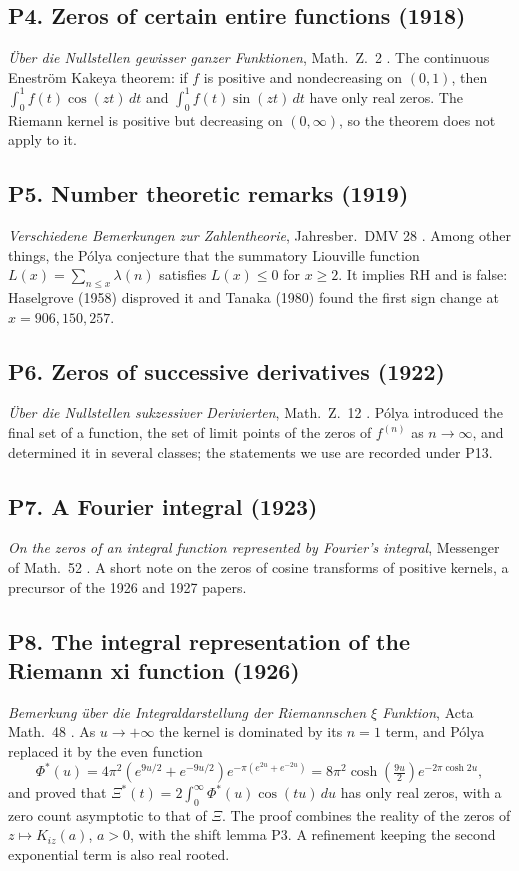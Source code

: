 \subsection*{P4. Zeros of certain entire functions (1918)}
\emph{\"Uber die Nullstellen gewisser ganzer Funktionen}, Math.\ Z.\ 2 \cite{Polya18}. The continuous Enestr\"om Kakeya theorem: if $f$ is positive and nondecreasing on $(0,1)$, then $\int_0^1f(t)\cos(zt)\,dt$ and $\int_0^1f(t)\sin(zt)\,dt$ have only real zeros. The Riemann kernel is positive but decreasing on $(0,\infty)$, so the theorem does not apply to it.

\subsection*{P5. Number theoretic remarks (1919)}
\emph{Verschiedene Bemerkungen zur Zahlentheorie}, Jahresber.\ DMV 28 \cite{Polya19}. Among other things, the P\'olya conjecture that the summatory Liouville function $L(x)=\sum_{n\le x}\lambda(n)$ satisfies $L(x)\le0$ for $x\ge2$. It implies RH and is false: Haselgrove (1958) \cite{Haselgrove58} disproved it and Tanaka (1980) \cite{Tanaka80} found the first sign change at $x=906{,}150{,}257$.

\subsection*{P6. Zeros of successive derivatives (1922)}
\emph{\"Uber die Nullstellen sukzessiver Derivierten}, Math.\ Z.\ 12 \cite{Polya22}. P\'olya introduced the final set of a function, the set of limit points of the zeros of $f^{(n)}$ as $n\to\infty$, and determined it in several classes; the statements we use are recorded under P13.

\subsection*{P7. A Fourier integral (1923)}
\emph{On the zeros of an integral function represented by Fourier's integral}, Messenger of Math.\ 52 \cite{Polya23m}. A short note on the zeros of cosine transforms of positive kernels, a precursor of the 1926 and 1927 papers.

\subsection*{P8. The integral representation of the Riemann xi function (1926)}
\emph{Bemerkung \"uber die Integraldarstellung der Riemannschen $\xi$ Funktion}, Acta Math.\ 48 \cite{Polya}. As $u\to+\infty$ the kernel is dominated by its $n=1$ term, and P\'olya replaced it by the even function
\begin{equation}\label{pol:eq:phistar}
\Phi^*(u)=4\pi^2\left(e^{9u/2}+e^{-9u/2}\right)e^{-\pi(e^{2u}+e^{-2u})}=8\pi^2\cosh\!\left(\tfrac{9u}{2}\right)e^{-2\pi\cosh 2u},
\end{equation}
and proved that $\Xi^*(t)=2\int_0^\infty\Phi^*(u)\cos(tu)\,du$ has only real zeros, with a zero count asymptotic to that of $\Xi$. The proof combines the reality of the zeros of $z\mapsto K_{iz}(a)$, $a>0$, with the shift lemma P3. A refinement keeping the second exponential term is also real rooted.

